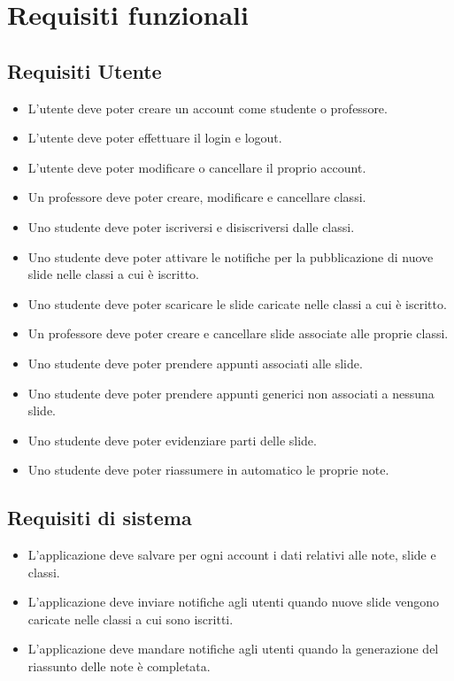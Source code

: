 \section{Requisiti funzionali}

\subsection{Requisiti Utente}
\begin{itemize}
    \item L'utente deve poter creare un account come studente o professore.
    \item L'utente deve poter effettuare il login e logout.
    \item L'utente deve poter modificare o cancellare il proprio account.
    \item Un professore deve poter creare, modificare e cancellare classi.
    \item Uno studente deve poter iscriversi e disiscriversi dalle classi.
    \item Uno studente deve poter attivare le notifiche per la pubblicazione di nuove slide nelle classi a cui è iscritto.
    \item Uno studente deve poter scaricare le slide caricate nelle classi a cui è iscritto.
    \item Un professore deve poter creare e cancellare slide associate alle proprie classi.
    \item Uno studente deve poter prendere appunti associati alle slide.
    \item Uno studente deve poter prendere appunti generici non associati a nessuna slide.
    \item Uno studente deve poter evidenziare parti delle slide.
    \item Uno studente deve poter riassumere in automatico le proprie note.
\end{itemize}

\subsection{Requisiti di sistema}
\begin{itemize}
    \item L'applicazione deve salvare per ogni account i dati relativi alle note, slide e classi.
    \item L'applicazione deve inviare notifiche agli utenti quando nuove slide vengono caricate nelle classi a cui sono iscritti.
    \item L'applicazione deve mandare notifiche agli utenti quando la generazione del riassunto delle note è completata.
\end{itemize}

